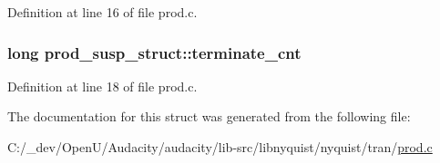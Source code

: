 Definition at line 16 of file prod.\+c.

\subsubsection[{\texorpdfstring{terminate\+\_\+cnt}{terminate_cnt}}]{\setlength{\rightskip}{0pt plus 5cm}long prod\+\_\+susp\+\_\+struct\+::terminate\+\_\+cnt}\hypertarget{structprod__susp__struct_a43f7459a50973cbf04033baf234ee9c3}{}\label{structprod__susp__struct_a43f7459a50973cbf04033baf234ee9c3}


Definition at line 18 of file prod.\+c.



The documentation for this struct was generated from the following file\+:\begin{DoxyCompactItemize}
\item 
C\+:/\+\_\+dev/\+Open\+U/\+Audacity/audacity/lib-\/src/libnyquist/nyquist/tran/\hyperlink{prod_8c}{prod.\+c}\end{DoxyCompactItemize}
